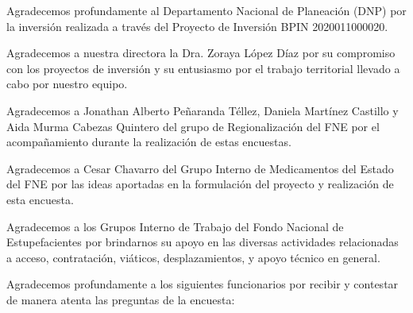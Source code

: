 \documentclass[
]{book}
\begin{document}
Agradecemos profundamente al Departamento Nacional de Planeación (DNP) por la inversión realizada a través del Proyecto de Inversión BPIN 2020011000020.

Agradecemos a nuestra directora la Dra. Zoraya López Díaz por su compromiso con los proyectos de inversión y su entusiasmo por el trabajo territorial llevado a cabo por nuestro equipo.

Agradecemos a Jonathan Alberto Peñaranda Téllez, Daniela Martínez Castillo y Aida Murma Cabezas Quintero del grupo de Regionalización del FNE por el acompañamiento durante la realización de estas encuestas.

Agradecemos a Cesar Chavarro del Grupo Interno de Medicamentos del Estado del FNE por las ideas aportadas en la formulación del proyecto y realización de esta encuesta.

Agradecemos a los Grupos Interno de Trabajo del Fondo Nacional de Estupefacientes por brindarnos su apoyo en las diversas actividades relacionadas a acceso, contratación, viáticos, desplazamientos, y apoyo técnico en general.

Agradecemos profundamente a los siguientes funcionarios por recibir y contestar de manera atenta las preguntas de la encuesta:
\end{document}
